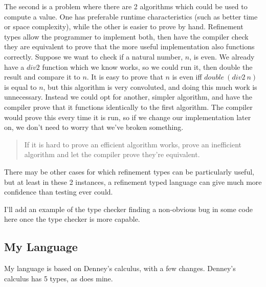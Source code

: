 The second is a problem where there are 2 algorithms which could be used to compute a value.
One has preferable runtime characteristics (such as better time or space complexity), while
the other is easier to prove by hand.
Refinement types allow the programmer to implement both, then have the compiler check they are
equivalent to prove that the more useful implementation also functions correctly.
Suppose we want to check if a natural number, $n$, is even.
We already have a $div2$ function which we know works, so we could run it, then double the
result and compare it to $n$.
It is easy to prove that $n$ is even iff $double\ (div2\ n)$ is equal to $n$, but this algorithm
is very convoluted, and doing this much work is unnecessary.
Instead we could opt for another, simpler algorithm, and have the compiler prove that it functions
identically to the first algorithm.
The compiler would prove this every time it is run, so if we change our implementation later on,
we don't need to worry that we've broken something.
\begin{quote}
    If it is hard to prove an efficient algorithm works, prove an inefficient algorithm and let the
    compiler prove they're equivalent.
\end{quote}

There may be other cases for which refinement types can be particularly useful, but at least in
these 2 instances, a refinement typed language can give much more confidence than testing ever
could.

\begin{itshape}
    I'll add an example of the type checker finding a non-obvious bug in some code here once the
    type checker is more capable.
\end{itshape}

\subsection{My Language}

My language is based on Denney's calculus, with a few changes.
Denney's calculus has 5 types, as does mine.

